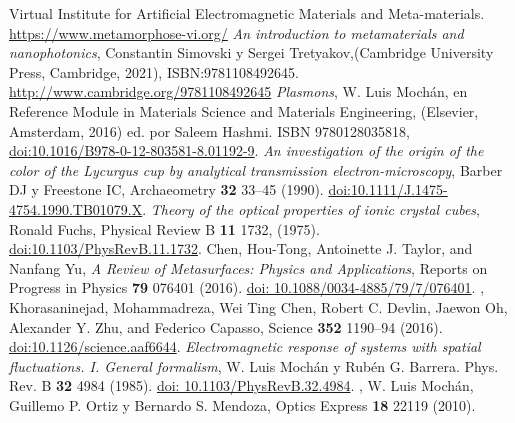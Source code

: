 \documentclass[12pt]{article}
\begin{document}
\begin{thebibliography}{0000}
 Virtual Institute for Artificial
  Electromagnetic Materials and
  Meta-materials. \url{https://www.metamorphose-vi.org/}
 {\em An introduction
  to metamaterials and nanophotonics}, Constantin Simovski y Sergei
Tretyakov,(Cambridge University Press, Cambridge, 2021), ISBN:9781108492645.
\url{http://www.cambridge.org/9781108492645}
 {\em Plasmons}, W. Luis Mochán,
        en Reference Module in Materials Science and Materials
        Engineering, (Elsevier, Amsterdam, 2016)
        ed. por Saleem Hashmi.
        ISBN 9780128035818,
        \href{http://dx.doi.org/10.1016/B978-0-12-803581-8.01192-9}
        {doi:10.1016/B978-0-12-803581-8.01192-9}.
 {\em  An
  investigation of the origin of the color of the Lycurgus cup by
  analytical transmission electron-microscopy}, Barber DJ y Freestone
IC,  Archaeometry {\bf 32} 33–45 (1990).
\href{https://onlinelibrary.wiley.com/doi/10.1111/j.1475-4754.1990.tb01079.x}
{doi:10.1111/J.1475-4754.1990.TB01079.X}.
 {\em Theory of the optical properties of ionic crystal
  cubes}, Ronald Fuchs, Physical Review B {\bf 11} 1732, (1975).
  \href{http://link.aps.org/doi/10.1103/PhysRevB.11.1732}{doi:10.1103/PhysRevB.11.1732}.
 Chen, Hou-Tong, Antoinette J. Taylor, and Nanfang
  Yu, {\em A Review of Metasurfaces: Physics and Applications},
  Reports on Progress in Physics {\bf 79} 076401 (2016).
  \href{https://doi.org/10.1088/0034-4885/79/7/076401}{doi: 10.1088/0034-4885/79/7/076401}.
,
    Khorasaninejad, Mohammadreza, Wei Ting Chen, Robert C. Devlin,
    Jaewon Oh, Alexander Y. Zhu, and Federico Capasso, Science
    {\bf 352} 1190–94 (2016).
    \href{https://doi.org/10.1126/science.aaf6644}{doi:10.1126/science.aaf6644}.
  {\em Electromagnetic response of systems with spatial
  fluctuations. I. General formalism}, W. Luis Mochán y Rubén
  G. Barrera. Phys. Rev. B {\bf 32} 4984
  (1985). \href{https://journals.aps.org/prb/abstract/10.1103/PhysRevB.32.4984}{doi:
    10.1103/PhysRevB.32.4984}.
,
 W. Luis Mochán, Guillemo P. Ortiz y Bernardo S. Mendoza,
 Optics Express {\bf 18} 22119 (2010).

\end{thebibliography}
\end{document}
